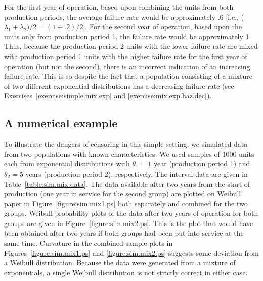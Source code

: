 For the first year of operation, based upon combining the units from
both production periods, the average failure rate would be
approximately .6 [i.e., ($\lambda_{1}+\lambda_{2})/2 = (1 + .2)/2]$.
For the second year of operation, based upon the units only from
production period 1, the failure rate would be approximately 1.
Thus, because the production period 2 units with the lower failure
rate are mixed with production period 1 units with the higher
failure rate for the first year of operation (but not the second),
there is an incorrect indication of an increasing failure rate.  This is
so despite the fact that a population consisting of a mixture of two
different exponential distributions has a decreasing failure rate
(see Exercises~\ref{exercise:simple.mix.exp} and
\ref{exercise:mix.exp.haz.dec}).

\subsection{A numerical example}
To illustrate the dangers of censoring in this simple setting, we
simulated data from two populations with known characteristics.  We used
samples of 1000 units each from exponential distributions with
$\theta_{1}=1$ year (production period 1) and $\theta_{2}=5$ years
(production period 2), respectively.  The interval data are given in
Table~\ref{table:sim.mix.data}. The data available after two years
from the start of production (one year in service for the second
group) are plotted on Weibull paper in Figure~\ref{figure:sim.mix1.ps}
both separately and combined for the two groups.  Weibull probability
plots of the data after two years of operation for both groups are
given in Figure~\ref{figure:sim.mix2.ps}.  This is the plot that would
have been obtained after two years if both groups had been put into
service at the same time.  Curvature in the combined-sample plots in
Figures~\ref{figure:sim.mix1.ps} and
\ref{figure:sim.mix2.ps} suggests some
deviation from a Weibull distribution. Because the data were
generated from a mixture of exponentials, a single Weibull
distribution is not strictly correct in either case.


